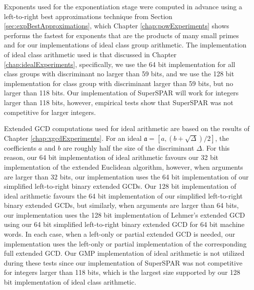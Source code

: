 \documentclass{ucalgthes1}
\theoremstyle{definition}
\newcommand{\ideal}{\mathfrak}
\begin{document}
Exponents used for the exponentiation stage were computed in advance using a left-to-right best approximations technique from Section \ref{sec:expBestApproximations}, which Chapter \ref{chap:powExperiments} shows performs the fastest for exponents that are the products of many small primes and for our implementations of ideal class group arithmetic.  The implementation of ideal class arithmetic used is that discussed in Chapter \ref{chap:idealExperiments}, specifically, we use the 64 bit implementation for all class groups with discriminant no larger than 59 bits, and we use the 128 bit implementation for class group with discriminant larger than 59 bits, but no larger than 118 bits.  Our implementation of SuperSPAR will work for integers larger than 118 bits, however, empirical tests show that SuperSPAR was not competitive for larger integers.

Extended GCD computations used for ideal arithmetic are based on the results of Chapter \ref{chap:xgcdExperiments}.  For an ideal $\ideal a = [a, (b + \sqrt\Delta)/2]$, the coefficients $a$ and $b$ are roughly half the size of the discriminant $\Delta$.  For this reason, our 64 bit implementation of ideal arithmetic favours our 32 bit implementation of the extended Euclidean algorithm, however, when arguments are larger than 32 bits, our implementation uses the 64 bit implementation of our simplified left-to-right binary extended GCDs.  Our 128 bit implementation of ideal arithmetic favours the 64 bit implementation of our simplified left-to-right binary extended GCDs, but similarly, when arguments are larger than 64 bits, our implementation uses the 128 bit implementation of Lehmer's extended GCD using our 64 bit simplified left-to-right binary extended GCD for 64 bit machine words.   In each case, when a left-only or partial extended GCD is needed, our implementation uses the left-only or partial implementation of the corresponding full extended GCD.  Our GMP implementation of ideal arithmetic is not utilized during these tests since our implementation of SuperSPAR was not competitive for integers larger than 118 bits, which is the largest size supported by our 128 bit implementation of ideal class arithmetic.
\end{document}
